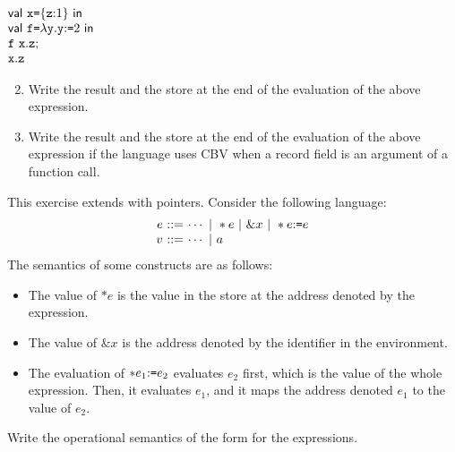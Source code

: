 \begin{exercise}
$
\begin{array}{@{}l@{}}
  \ebind{\cx}{\{\cz{:}1\}}{ \\
  \ebind{\cf}{\efun{\cy}{\eset{\cy}{2}}}{ \\
  \eseq{\eapp{\cf}{\cx.\cz}}{ \\
  \cx.\cz}}}
\end{array}
$

\begin{enumerate}
  \setcounter{enumii}{1}
  \item Write the result and the store at the end of the evaluation of
  the above expression.
  \item Write the result and the store at the end of the evaluation of
  the above expression
  if the language uses CBV when a record field is an argument
  of a function call.
\end{enumerate}

\end{exercise}

\begin{exercise}

This exercise extends \lang with pointers.
Consider the following language:
\[
  \begin{array}{@{}r@{~}r@{~}l@{}}
    e & ::= & \cdots\ |\ \ast e \ |\ \& x\ |\ \ast\eset{e}{e} \\
    v & ::= & \cdots\ |\ a \\
  \end{array}
\]
The semantics of some constructs are as follows:
\begin{itemize}
  \item The value of $\ast e$ is the value in the store at the address denoted by
    the expression.
  \item The value of $\& x$ is the address denoted by the identifier in the environment.
  \item The evaluation of $\ast e_1{:}\texttt{=} e_2$ evaluates $e_2$ first, which is
    the value of the whole expression. Then, it evaluates $e_1$, and it maps the
    address denoted $e_1$ to the value of $e_2$.
\end{itemize}
Write the operational semantics of the form  for the expressions.

\end{exercise}

